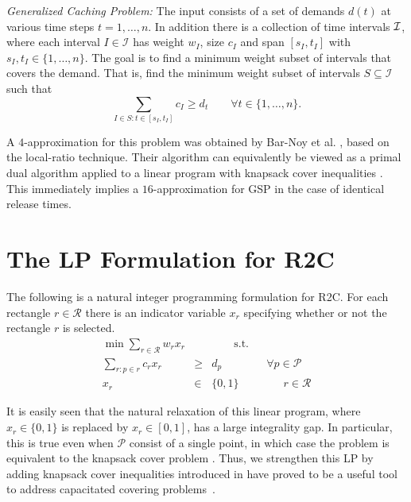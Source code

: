 \documentclass[11pt]{article}
\begin{document}
\medskip
{\em Generalized Caching Problem:} The input consists of a set of demands $d(t)$ at various time steps $t=1,\ldots,n$. In addition there is a collection of 
time intervals  $\cal{I}$, where each interval $ I \in \mathcal{I}$ has weight $w_I$, size $c_I$ and span
$[s_I,t_I]$ with $s_I,t_I \in \{1,\ldots,n\}$. The goal is to find a minimum weight subset of intervals that covers the demand. That is, find the minimum weight subset of intervals $S \subseteq \mathcal{I}$ such that 
$$ \sum_{I \in S: t \in [s_I,t_I]} c_I \geq d_t \qquad \forall t \in \{1,\ldots,n\}.$$

A $4$-approximation for this problem was obtained by Bar-Noy et al. \cite{BBF}, based
on the local-ratio technique. Their algorithm can equivalently be viewed as a primal dual algorithm
applied to a linear program with knapsack cover inequalities \cite{BR}.
This immediately implies a $16$-approximation for GSP in the case of identical release times.


\section{The LP Formulation for R2C}
\label{sec:preliminaries}

The following is a natural integer programming formulation for
R2C. For each rectangle $r \in {\mathcal R}$ there is an indicator variable
$x_r$ specifying whether or not the rectangle $r$ is selected.
\begin{eqnarray}
\min\sum_{r \in {\mathcal R}} w_r x_r &&  \qquad \mbox{s.t.} \nonumber \\
\label{cap:simple} 
\sum_{ r : p \in r}  c_r x_r &\ge& d_p  \qquad \qquad \forall p \in {\mathcal P} \\
 x_r & \in &  \{0,1\} \qquad \qquad r \in {\mathcal R} 
\end{eqnarray}


It is easily seen 
that the natural relaxation of this linear program, where $x_{r} \in \{0,1\}$ 
is replaced by $x_{r} \in [0, 1]$, has a
large integrality gap. In particular, this is true even when ${\mathcal P}$ consist of a single point, in which case the problem is equivalent to the knapsack cover problem \cite{CarrFLP00}.
Thus, we strengthen this LP by adding knapsack cover inequalities introduced in \cite{CarrFLP00}
have proved 
to be a useful tool to address capacitated covering problems~\cite{gencaching, shmoys, sviri, BansalGK2010, CGK10}. 
\end{document}
